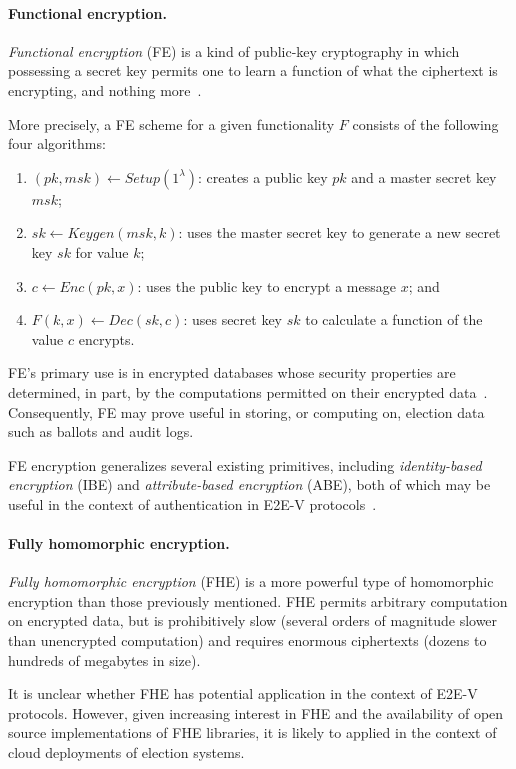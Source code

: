 \paragraph{Functional encryption.} \emph{Functional encryption} (FE)
is a kind of public-key cryptography in which possessing a secret key
permits one to learn a function of what the ciphertext is encrypting,
and nothing more~\cite{boneh2011functional}.

More precisely, a FE scheme for a given functionality $F$ consists of
the following four algorithms:
\begin{enumerate}
\item $(pk, msk) \leftarrow Setup(1^\lambda)$: creates a public key
  $pk$ and a master secret key $msk$;
\item $sk \leftarrow Keygen(msk, k)$: uses the master secret key to
  generate a new secret key $sk$ for value $k$;
\item $c \leftarrow Enc(pk, x)$: uses the public key to encrypt a
  message $x$; and \item $F(k, x) \leftarrow Dec(sk, c)$: uses secret
  key $sk$ to calculate a function of the value $c$ encrypts.
\end{enumerate}

FE's primary use is in encrypted databases whose security properties
are determined, in part, by the computations permitted on their
encrypted data~\cite{Popa11}. Consequently, FE may prove useful in
storing, or computing on, election data such as ballots and audit
logs.

FE encryption generalizes several existing primitives, including
\emph{identity-based encryption} (IBE) and \emph{attribute-based
  encryption} (ABE), both of which may be useful in the context of
authentication in E2E-V
protocols~\cite{shamir1985identity,goyal2006attribute}.

\paragraph{Fully homomorphic encryption.} \emph{Fully homomorphic
  encryption} (FHE) is a more powerful type of homomorphic encryption
than those previously mentioned. FHE permits arbitrary computation on
encrypted data, but is prohibitively slow (several orders of magnitude
slower than unencrypted computation) and requires enormous ciphertexts
(dozens to hundreds of megabytes in size).

It is unclear whether FHE has potential application in the context of
E2E-V protocols. However, given increasing interest in FHE and the
availability of open source implementations of FHE libraries, it is
likely to applied in the context of cloud deployments of election
systems.


